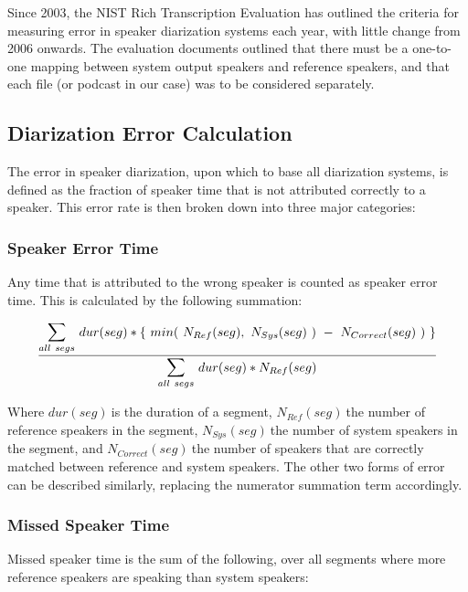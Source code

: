 \doublespacing
Since 2003, the NIST Rich Transcription Evaluation \cite{NIST2006web} has outlined the criteria for measuring error in speaker diarization systems each year, with little change from 2006 onwards. The evaluation documents outlined that there must be a one-to-one mapping between system output speakers and reference speakers, and that each file (or podcast in our case) was to be considered separately. \par

\singlespacing
\subsection{Diarization Error Calculation}

\doublespacing
The error in speaker diarization, upon which to base all diarization systems, is defined as the fraction of speaker time that is not attributed correctly to a speaker. This error rate is then broken down into three major categories:

\singlespacing
\subsubsection{Speaker Error Time}

\doublespacing
Any time that is attributed to the wrong speaker is counted as speaker error time. This is calculated by the following summation:

\singlespacing
$$ \frac{\mathlarger{\mathlarger{\sum}}_{all\ segs}\ dur(seg) * \{\ min(\ N_{Ref}(seg),\ N_{Sys}(seg)\ )\ -\ N_{Correct}(seg)\ )\ \}}{\mathlarger{\mathlarger{\sum}}_{all\ segs}\ dur(seg) * N_{Ref}(seg)} $$

\doublespacing
\noindent Where \( dur(seg)\ \)is the duration of a segment, \( N_{Ref}(seg)\ \)the number of reference speakers in the segment, \( N_{Sys}(seg)\ \)the number of system speakers in the segment, and \( N_{Correct}(seg)\ \)the number of speakers that are correctly matched between reference and system speakers. The other two forms of error can be described similarly, replacing the numerator summation term accordingly.

\singlespacing
\subsubsection{Missed Speaker Time}

\doublespacing
Missed speaker time is the sum of the following, over all segments where more reference speakers are speaking than system speakers:

